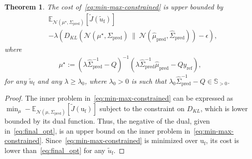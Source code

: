 \documentclass[10pt,a4paper]{amsart}
\newtheorem{thm}{Theorem}
\def\Sp{\Sigma_\mathrm{pred}}
\def\Sph{\hat{\Sigma}_\mathrm{pred}}
\def\mph{\hat{\mu}_\mathrm{pred}}
\def\ufr{\mathrm{u}_\mathrm{f}}
\def\uft{\tilde{u}_\mathrm{f}}
\def\yr{y_\mathrm{ref}}
\begin{document}
\begin{thm} \label{thm:final}
    The cost of~\eqref{eq:min-max-constrained} is upper bounded by
    \begin{align} \label{eq:final_opt}
        & \mathbb{E}_{\mathcal{N}(\mu^\star,\Sp)}[\tilde{J}(\uft)] \\
    & -\lambda\left( D_{KL}\left(\mathcal{N}(\mu^\star,\Sp)~\big\|~\mathcal{N}(\mph,\Sph)\right) - \epsilon\right), \nonumber
    \end{align}
    where
    \begin{align*} 
        \mu^\star := (\lambda \Sph^{-1}-Q)^{-1}(\lambda\Sph^{-1}\mph -Q\yr),
    \end{align*}
    for any $\uft$ and any $\lambda\geq\lambda_0$, where $\lambda_0>0$ is such that $\lambda_0\Sph^{-1}-Q\in\mathbb{S}_{>0}$.
\end{thm}

\begin{proof}
    The inner problem in~\eqref{eq:min-max-constrained} can be expressed as $\min_{\mu}-\mathbb{E}_{\mathcal{N}(\mu,\Sp)}[\tilde{J}(\ufr)]$ subject to the constraint on $D_{KL}$, which is lower bounded by its dual function. Thus, the negative of the dual, given in~\eqref{eq:final_opt}, is an upper bound on the inner problem in~\eqref{eq:min-max-constrained}.
    Since~\eqref{eq:min-max-constrained} is minimized over $\ufr$, its cost is lower than~\eqref{eq:final_opt} for any $\uft$.
\end{proof}
\end{document}
